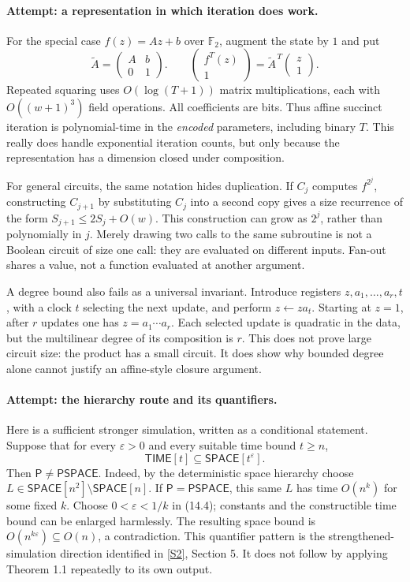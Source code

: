 \documentclass[11pt,a4paper]{article}
\newcommand{\F}{\mathbb{F}}
\newcommand{\sref}[2]{\hyperlink{source:#1:#2}{[S#2]}}
\begin{document}
\paragraph{Attempt: a representation in which iteration does work.}
For the special case $f(z)=Az+b$ over $\F_2$, augment the state by $1$ and
put
\[
 \widetilde A=\begin{pmatrix}A&b\\0&1\end{pmatrix}.
 \qquad
 \begin{pmatrix}f^T(z)\\1\end{pmatrix}
 =\widetilde A^{\,T}\begin{pmatrix}z\\1\end{pmatrix}. \tag{14.3}
\]
Repeated squaring uses $O(\log(T+1))$ matrix multiplications, each with
$O((w+1)^3)$ field operations. All coefficients are bits. Thus affine
succinct iteration is polynomial-time in the \emph{encoded} parameters,
including binary $T$. This really does handle exponential iteration
counts, but only because the representation has a dimension closed
under composition.

For general circuits, the same notation hides duplication. If $C_j$
computes $f^{2^j}$, constructing $C_{j+1}$ by substituting $C_j$ into a
second copy gives a size recurrence of the form
$S_{j+1}\leq2S_j+O(w)$. This construction can grow as $2^j$, rather than
polynomially in $j$. Merely drawing two calls to the same subroutine is
not a Boolean circuit of size one call: they are evaluated on different
inputs. Fan-out shares a value, not a function evaluated at another
argument.

A degree bound also fails as a universal invariant. Introduce registers
$z,a_1,\ldots,a_r,t$, with a clock $t$ selecting the next update, and
perform $z\leftarrow za_t$. Starting at $z=1$, after $r$ updates one has
$z=a_1\cdots a_r$. Each selected update is quadratic in the data, but the
multilinear degree of its composition is $r$. This does not prove large
circuit size: the product has a small circuit. It does show why bounded
degree alone cannot justify an affine-style closure argument.

\paragraph{Attempt: the hierarchy route and its quantifiers.}
Here is a sufficient stronger simulation, written as a conditional
statement. Suppose that for every $\varepsilon>0$ and every suitable
time bound $t\geq n$,
\[
 \mathsf{TIME}[t]\subseteq\mathsf{SPACE}[t^{\varepsilon}]. \tag{14.4}
\]
Then $\mathsf P\ne\mathsf{PSPACE}$. Indeed, by the deterministic space
hierarchy choose
$L\in\mathsf{SPACE}[n^2]\setminus\mathsf{SPACE}[n]$.
If $\mathsf P=\mathsf{PSPACE}$, this same $L$ has time $O(n^k)$ for some
fixed $k$. Choose $0<\varepsilon<1/k$ in (14.4); constants and the
constructible time bound can be enlarged harmlessly. The resulting
space bound is $O(n^{k\varepsilon})\subseteq O(n)$, a contradiction.
This quantifier pattern is the strengthened-simulation direction
identified in \sref{3402}{2}, Section 5. It does not follow by applying
Theorem 1.1 repeatedly to its own output.
\end{document}
